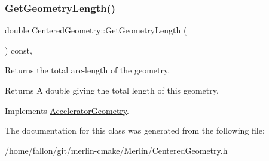 \subsubsection{\texorpdfstring{Get\+Geometry\+Length()}{GetGeometryLength()}}
{\footnotesize\ttfamily double Centered\+Geometry\+::\+Get\+Geometry\+Length (\begin{DoxyParamCaption}{ }\end{DoxyParamCaption}) const\hspace{0.3cm}{\ttfamily [inline]}, {\ttfamily [virtual]}}

Returns the total arc-\/length of the geometry. \begin{DoxyReturn}{Returns}
A double giving the total length of this geometry. 
\end{DoxyReturn}


Implements \hyperlink{classAcceleratorGeometry_abc36f96d542e0d9db592f8e7ee455769}{Accelerator\+Geometry}.



The documentation for this class was generated from the following file\+:\begin{DoxyCompactItemize}
\item 
/home/fallon/git/merlin-\/cmake/\+Merlin/Centered\+Geometry.\+h\end{DoxyCompactItemize}
